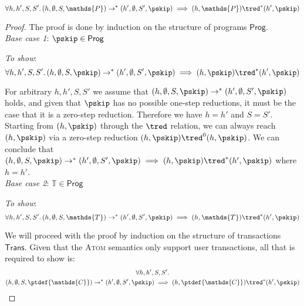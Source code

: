 \begin{thm}

\label{thm:atom}

\[
	\forall h, h', S, S' \ldotp
	(h, \emptyset, S, \mathds{P}) \rightarrow^* (h', \emptyset, S', \pskip) \implies 
	(h, \mathds{P}) \tred^* (h', \pskip)
\]

{\parindent0pt
\begin{proof}
The proof is done by induction on the structure of programs $\mathsf{Prog}$. \\
\indline
\textit{Base case 1}: $\pskip \in \mathsf{Prog}$

\textit{To show}:
\[
	\forall h, h', S, S' \ldotp
	(h, \emptyset, S, \pskip) \rightarrow^* (h', \emptyset, S', \pskip) \implies 
	(h, \pskip) \tred^* (h', \pskip)
\]

For arbitrary $h, h', S, S'$ we assume that $(h, \emptyset, S, \pskip) \rightarrow^* (h', \emptyset, S', \pskip)$ holds, and given that $\pskip$ has no possible one-step reductions, it must be the case that it is a zero-step reduction. Therefore we have $h = h'$ and $S = S'$. Starting from $(h, \pskip)$ through the $\tred$ relation, we can always reach $(h, \pskip)$ via a zero-step reduction $(h, \pskip) \tred^0 (h, \pskip)$. We can conclude that $(h, \emptyset, S, \pskip) \rightarrow^* (h', \emptyset, S', \pskip) \implies (h, \pskip) \tred^* (h', \pskip)$ where $h = h'$. \\
\indline
\textit{Base case 2}: $\mathds{T} \in \mathsf{Prog}$

\textit{To show}:
\[
	\forall h, h', S, S' \ldotp
	(h, \emptyset, S, \mathds{T}) \rightarrow^* (h', \emptyset, S', \pskip) \implies 
	(h, \mathds{T}) \tred^* (h', \pskip)
\]

We will proceed with the proof by induction on the structure of transactions $\mathsf{Trans}$. Given that the \textsc{Atom} semantics only support user transactions, all that is required to show is:
\begin{gather*}
	\forall h, h', S, S' \ldotp \\
	(h, \emptyset, S, \ptdef{\mathds{C}}) \rightarrow^* (h', \emptyset, S', \pskip) \implies 
	(h, \ptdef{\mathds{C}}) \tred^* (h', \pskip)
\end{gather*}


\end{proof}}
\end{thm}
